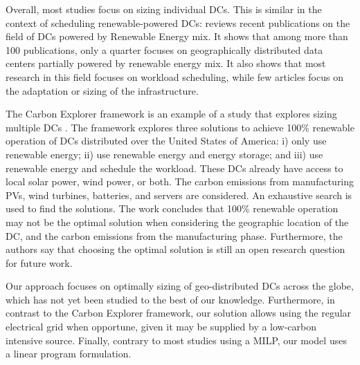 Overall, most studies focus on sizing individual DCs. This is similar in the context of scheduling renewable-powered DCs: \citet{SONG2022326} reviews recent publications on the field of DCs powered by Renewable Energy mix. It shows that among more than 100 publications, only a quarter focuses on geographically distributed data centers partially powered by renewable energy mix. It also shows that most research in this field focuses on workload scheduling, while few articles focus on the adaptation or sizing of the infrastructure.


The Carbon Explorer framework is an example of a study that explores sizing multiple DCs \cite{acun2022holistic}. The framework explores three solutions to achieve 100\% renewable operation of DCs distributed over the United States of America: i) only use renewable energy; ii) use renewable energy and energy storage; and iii) use renewable energy and schedule the workload. These DCs already have access to local solar power, wind power, or both. The carbon emissions from manufacturing PVs, wind turbines, batteries, and servers are considered. An exhaustive search is used to find the solutions. The work concludes that 100\% renewable operation may not be the optimal solution when considering the geographic location of the DC, and the carbon emissions from the manufacturing phase. Furthermore, the authors say that choosing the optimal solution is still an open research question for future work.


Our approach focuses on optimally sizing of geo-distributed DCs across the globe, which has not yet been studied to the best of our knowledge. Furthermore, in contrast to the Carbon Explorer framework, our solution allows using the regular electrical grid when opportune, given it may be supplied by a low-carbon intensive source. Finally, contrary to most studies using a MILP, our model uses a linear program formulation.







